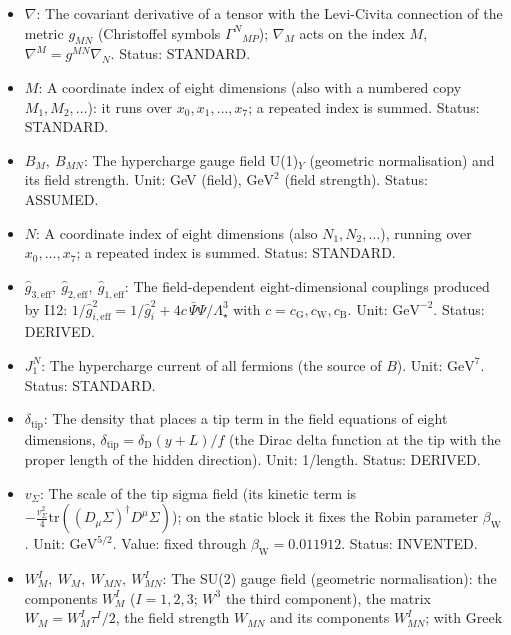 \documentclass[
  10pt,
]{article}
\providecommand{\tightlist}{%
  \setlength{\itemsep}{0pt}\setlength{\parskip}{0pt}}
\begin{document}
\begin{itemize}
\tightlist
\item
  \(\nabla\): The covariant derivative of a tensor with the Levi-Civita
  connection of the metric \(g_{MN}\) (Christoffel symbols
  \(\Gamma^N{}_{MP}\)); \(\nabla_M\) acts on the index \(M\),
  \(\nabla^M = g^{MN}\nabla_N\). Status: STANDARD.
\item
  \(M\): A coordinate index of eight dimensions (also with a numbered
  copy \(M_1, M_2, \dots\)): it runs over \(x_0, x_1, \dots, x_7\); a
  repeated index is summed. Status: STANDARD.
\item
  \(B_M,\ B_{MN}\): The hypercharge gauge field U(1)\(_Y\) (geometric
  normalisation) and its field strength. Unit: GeV (field),
  \(\mathrm{GeV}^{2}\) (field strength). Status: ASSUMED.
\item
  \(N\): A coordinate index of eight dimensions (also
  \(N_1, N_2, \dots\)), running over \(x_0, \dots, x_7\); a repeated
  index is summed. Status: STANDARD.
\item
  \(\hat g_{3,\mathrm{eff}},\ \hat g_{2,\mathrm{eff}},\ \hat g_{1,\mathrm{eff}}\):
  The field-dependent eight-dimensional couplings produced by I12:
  \(1/\hat g_{i,\mathrm{eff}}^2 = 1/\hat g_i^2 + 4c\,\bar\Psi\Psi/\Lambda_\star^3\)
  with \(c = c_{\mathrm{G}}, c_{\mathrm{W}}, c_{\mathrm{B}}\). Unit:
  \(\mathrm{GeV}^{-2}\). Status: DERIVED.
\item
  \(J_1^N\): The hypercharge current of all fermions (the source of
  \(B\)). Unit: \(\mathrm{GeV}^{7}\). Status: STANDARD.
\item
  \(\delta_{\mathrm{tip}}\): The density that places a tip term in the
  field equations of eight dimensions,
  \(\delta_{\mathrm{tip}} = \delta_{\mathrm{D}}(y + L)/f\) (the Dirac
  delta function at the tip with the proper length of the hidden
  direction). Unit: 1/length. Status: DERIVED.
\item
  \(v_\Sigma\): The scale of the tip sigma field (its kinetic term is
  \(-\frac{v_\Sigma^2}{4}\mathrm{tr}((D_\mu\Sigma)^\dagger D^\mu\Sigma)\));
  on the static block it fixes the Robin parameter
  \(\beta_{\mathrm{W}}\). Unit: \(\mathrm{GeV}^{5/2}\). Value: fixed
  through \(\beta_{\mathrm{W}} = 0.011912\). Status: INVENTED.
\item
  \(W^I_M,\ W_M,\ W_{MN},\ W^I_{MN}\): The SU(2) gauge field (geometric
  normalisation): the components \(W^I_M\) (\(I = 1, 2, 3\); \(W^3\) the
  third component), the matrix \(W_M = W^I_M\tau^I/2\), the field
  strength \(W_{MN}\) and its components \(W^I_{MN}\); with Greek

\end{itemize}
\end{document}
